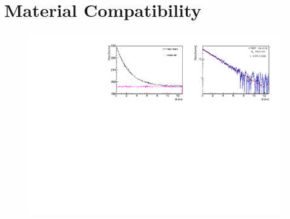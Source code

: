 


\section{Material Compatibility}


\begin{figure}[H]
	\centering
	\includegraphics[width=1.\linewidth]{"tex/6-ac227-images/BNL/RnPoDt_TimeBin23_S2"}
	\caption{}
	\label{fig:rnpodttimebin23s2}
\end{figure}


